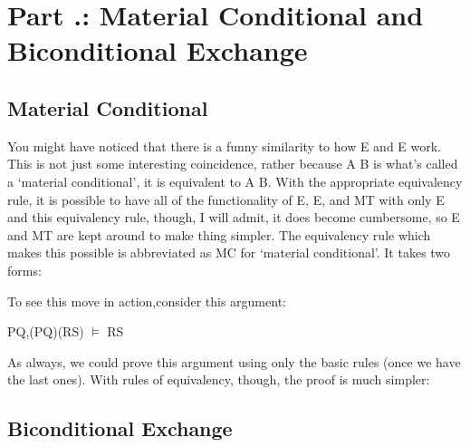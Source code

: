 \section{Part \thechapcount.\theseccount: Material Conditional and Biconditional Exchange}
\subsection{Material Conditional}

You might have noticed that there is a funny similarity to how \eif E and \eor E work. This is not just some interesting coincidence, rather because A \eif  B is what's called a `material conditional', it is equivalent to \enot A \eor  B. With the appropriate equivalency rule, it is possible to have all of the functionality of \eor E, \eif E, and MT with only \eor E and this equivalency rule, though, I will admit, it does become cumbersome, so \eif E and MT are kept around to make thing simpler. The equivalency rule which makes this possible is abbreviated as MC for `material conditional'. It takes two forms:

To see this move in action,consider this argument:
\begin{center}
\enot P\eor Q,(P\eif Q)\eif (\enot R\eif S) $\vDash$ R\eor S
\end{center}
As always, we could prove this argument using only the basic rules (once we have the last ones). With rules of equivalency, though, the proof is much simpler:
\begin{fitchproof}
\end{fitchproof}	
\subsection{Biconditional Exchange}

